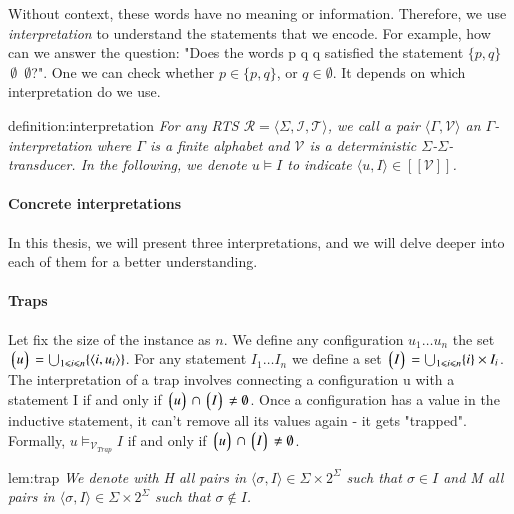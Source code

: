 Without context, these words have no meaning or information.
Therefore, we use \textit{interpretation} to understand the statements that we encode.
For example, how can we answer the question: "Does the words p q q satisfied the statement $\lbrace p,q \rbrace$  $\,\emptyset$ $\,\emptyset$?".
One we can check whether
$p \in \lbrace p,q \rbrace$, or $q \in \emptyset$.
It depends on which interpretation do we use.

\begin{theo}[Interpretation]{definition:interpretation}
    \textit{
        For any RTS $\mathcal{R} = \langle \Sigma, \mathcal{I}, \mathcal{T} \rangle$, we call 
        a pair $\langle \Gamma, \mathcal{V} \rangle$ an $\Gamma$-\textit{interpretation}
        where $\Gamma$ is a finite alphabet and $\mathcal{V}$ is a deterministic $\Sigma$-$\Sigma$-\textit{transducer}.
        In the following, we denote $ u \models I $ to indicate $ \langle u, I \rangle \in [[\mathcal{V}]]$.
     }
\end{theo}

\paragraph*{Concrete interpretations}
In this thesis, we will present three interpretations, and we will delve deeper into each 
of them for a better understanding.

\paragraph*{Traps} 
Let fix the size of the instance as $n$. We define any configuration 
$u_1 \dots u_n$ the set $\left\lgroup u \right\rgroup = \bigcup_{1 \leqslant i \leqslant n} \lbrace\langle i, u_i \rangle \rbrace$.
For any statement $I_1 \dots I_n$ we define a set $\left\lgroup I \right\rgroup = \bigcup_{1 \leqslant i \leqslant n} \lbrace i \rbrace \times I_i$.
The interpretation of a trap involves connecting a configuration u with a statement I if and only if
$\left\lgroup u \right\rgroup \cap \left\lgroup I \right\rgroup \neq \emptyset$.
Once a configuration has a value in the inductive statement, it can't remove all its values again - 
it gets "trapped". Formally, $u \models_{\mathcal{V}_{Trap}} I$ if and only if $\left\lgroup u \right\rgroup \cap \left\lgroup I \right\rgroup \neq \emptyset$.

\begin{lem}{lem:trap}
    \textit{We denote with H all pairs in $\langle \sigma, I \rangle \in \Sigma \times 2^{\Sigma}$
    such that  $\sigma \in I$ and M all pairs in $\langle \sigma, I \rangle \in \Sigma \times 2^{\Sigma}$
    such that  $\sigma \notin I$.}

\end{lem}

